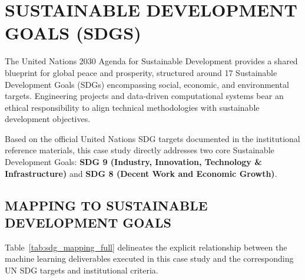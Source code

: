 \chapter{SUSTAINABLE DEVELOPMENT GOALS (SDGS)}

The United Nations 2030 Agenda for Sustainable Development provides a shared blueprint for global peace and prosperity, structured around 17 Sustainable Development Goals (SDGs) encompassing social, economic, and environmental targets. Engineering projects and data-driven computational systems bear an ethical responsibility to align technical methodologies with sustainable development objectives. 

Based on the official United Nations SDG targets documented in the institutional reference materials, this case study directly addresses two core Sustainable Development Goals: \textbf{SDG 9 (Industry, Innovation, Technology \& Infrastructure)} and \textbf{SDG 8 (Decent Work and Economic Growth)}.

\section{MAPPING TO SUSTAINABLE DEVELOPMENT GOALS}
Table~\ref{tab:sdg_mapping_full} delineates the explicit relationship between the machine learning deliverables executed in this case study and the corresponding UN SDG targets and institutional criteria.

